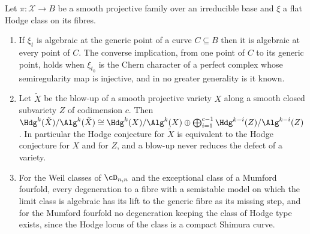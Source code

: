 \begin{proposition}\label{prop:bypass}
Let $\pi:\mathcal{X}\to B$ be a smooth projective family over an irreducible base and $\xi$ a flat Hodge class on its fibres.
\begin{enumerate}[label=\textup{(\roman*)},leftmargin=2.4em,itemsep=2pt]
\item If $\xi_{t}$ is algebraic at the generic point of a curve $C\subseteq B$ then it is algebraic at every point of $C$. The converse implication, from one point of $C$ to its generic point, holds when $\xi_{t_{0}}$ is the Chern character of a perfect complex whose semiregularity map is injective, and in no greater generality is it known.
\item Let $\tilde X$ be the blow-up of a smooth projective variety $X$ along a smooth closed subvariety $Z$ of codimension $c$. Then $\Hdg^{k}(\tilde X)/\Alg^{k}(\tilde X)\cong\Hdg^{k}(X)/\Alg^{k}(X)\oplus\bigoplus_{i=1}^{c-1}\Hdg^{k-i}(Z)/\Alg^{k-i}(Z)$. In particular the Hodge conjecture for $\tilde X$ is equivalent to the Hodge conjecture for $X$ and for $Z$, and a blow-up never reduces the defect of a variety.
\item For the Weil classes of $\cD_{n,n}$ and the exceptional class of a Mumford fourfold, every degeneration to a fibre with a semistable model on which the limit class is algebraic has its lift to the generic fibre as its missing step, and for the Mumford fourfold no degeneration keeping the class of Hodge type exists, since the Hodge locus of the class is a compact Shimura curve.
\end{enumerate}
\end{proposition}


